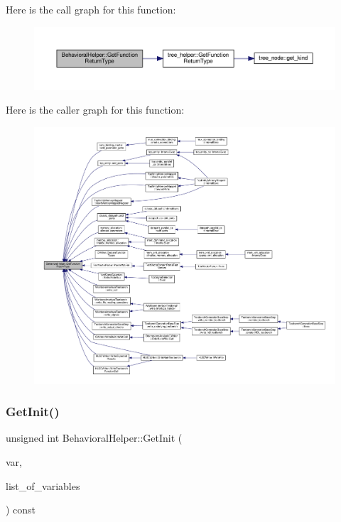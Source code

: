 Here is the call graph for this function\+:
\nopagebreak
\begin{figure}[H]
\begin{center}
\leavevmode
\includegraphics[width=350pt]{dd/db2/classBehavioralHelper_aef8f504d20cd83dd699378e233b86ae6_cgraph}
\end{center}
\end{figure}
Here is the caller graph for this function\+:
\nopagebreak
\begin{figure}[H]
\begin{center}
\leavevmode
\includegraphics[width=350pt]{dd/db2/classBehavioralHelper_aef8f504d20cd83dd699378e233b86ae6_icgraph}
\end{center}
\end{figure}
\mbox{\label{classBehavioralHelper_a60ede8d00944093fe896d3d24c4f3426}} 
\subsubsection{\texorpdfstring{Get\+Init()}{GetInit()}}
{\footnotesize\ttfamily unsigned int Behavioral\+Helper\+::\+Get\+Init (\begin{DoxyParamCaption}\item[{unsigned int}]{var,  }\item[{\hyperlink{classCustomUnorderedSet}{Custom\+Unordered\+Set}$<$ unsigned int $>$ \&}]{list\+\_\+of\+\_\+variables }\end{DoxyParamCaption}) const\hspace{0.3cm}{\ttfamily [virtual]}}



